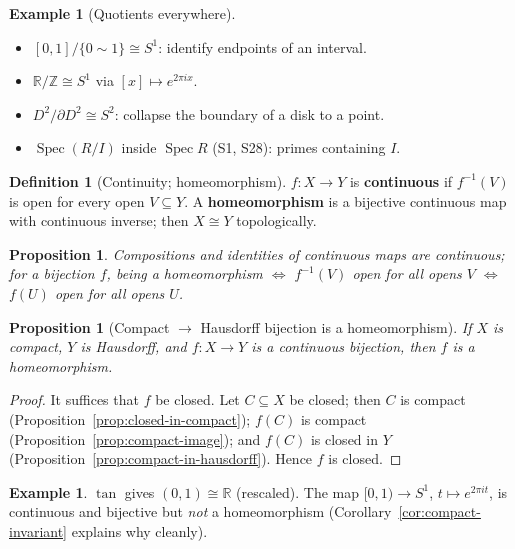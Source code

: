 \documentclass[11pt,a4paper]{article}
\newtheorem{proposition}[theorem]{Proposition}
\theoremstyle{definition}
\newtheorem{definition}[theorem]{Definition}
\newtheorem{example}[theorem]{Example}
\newcommand{\R}{\mathbb{R}}
\newcommand{\Z}{\mathbb{Z}}
\newcommand{\Spec}{\operatorname{Spec}}
\begin{document}
	\begin{example}[Quotients everywhere]\label{ex:quotients}
		\begin{itemize}
			\item $[0,1]/\{0\sim1\}\cong S^1$: identify endpoints of an interval.
			\item $\R/\Z\cong S^1$ via $[x]\mapsto e^{2\pi ix}$.
			\item $D^2/\partial D^2\cong S^2$: collapse the boundary of a disk to a point.
			\item $\Spec(R/I)$ inside $\Spec R$ (S1, S28): primes containing $I$.
		\end{itemize}
	\end{example}
	
	\begin{definition}[Continuity; homeomorphism]
		$f:X\to Y$ is \textbf{continuous} if $f^{-1}(V)$ is open for every open $V\subseteq Y$. A
		\textbf{homeomorphism} is a bijective continuous map with continuous inverse; then $X\cong Y$ topologically.
	\end{definition}
	
	\begin{proposition}\label{prop:cont-comp}
		Compositions and identities of continuous maps are continuous; for a bijection $f$, being a
		homeomorphism $\iff$ $f^{-1}(V)$ open for all opens $V$ $\iff$ $f(U)$ open for all opens $U$.
	\end{proposition}
	
	\begin{proposition}[Compact $\to$ Hausdorff bijection is a homeomorphism]\label{prop:compact-hausdorff}
		If $X$ is compact, $Y$ is Hausdorff, and $f:X\to Y$ is a continuous bijection, then $f$ is a homeomorphism.
	\end{proposition}
	\begin{proof}
		It suffices that $f$ be closed. Let $C\subseteq X$ be closed; then $C$ is compact
		(Proposition~\ref{prop:closed-in-compact}); $f(C)$ is compact (Proposition~\ref{prop:compact-image});
		and $f(C)$ is closed in $Y$ (Proposition~\ref{prop:compact-in-hausdorff}). Hence $f$ is closed.
	\end{proof}
	
	\begin{example}\label{ex:homeo}
		$\tan$ gives $(0,1)\cong\R$ (rescaled). The map $[0,1)\to S^1$, $t\mapsto e^{2\pi it}$, is continuous
		and bijective but \emph{not} a homeomorphism (Corollary~\ref{cor:compact-invariant} explains why cleanly).
	\end{example}
	
\end{document}
